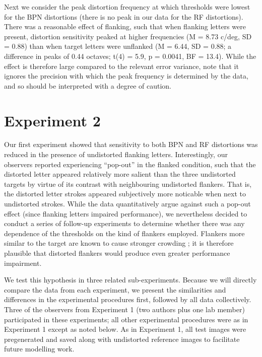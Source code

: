 \documentclass[doc, 11pt,a4paper,natbib]{apa6}\usepackage[]{graphicx}\usepackage[]{color}
\begin{document}
Next we consider the peak distortion frequency at which thresholds were lowest for the BPN distortions (there is no peak in our data for the RF distortions).
There was a reasonable effect of flanking, such that when flanking letters were present, distortion sensitivity peaked at higher frequencies
(M = 8.73 c/deg,
SD = 0.88)
than when target letters were unflanked
(M = 6.44,
SD = 0.88; a difference in
peaks of
0.44
octaves;
t(4) = 5.9, p = 0.0041, BF = 13.4).
While the effect is therefore large compared to the relevant error variance, note that it ignores the precision with which the peak frequency is determined by the data, and so should be interpreted with a degree of caution.






\section{Experiment 2}

Our first experiment showed that sensitivity to both BPN and RF distortions was reduced in the presence of undistorted flanking letters.
Interestingly, our observers reported experiencing ``pop-out'' in the flanked condition, such that the distorted letter appeared relatively more salient than the three undistorted targets by virtue of its contrast with neighbouring undistorted flankers.
That is, the distorted letter strokes appeared subjectively more noticable when next to undistorted strokes.
While the data quantitatively argue against such a pop-out effect (since flanking letters impaired performance), we nevertheless decided to conduct a series of follow-up experiments to determine whether there was any dependence of the thresholds on the kind of flankers employed.
Flankers more similar to the target are known to cause stronger crowding \citep[e.g.][]{bernard_dependence_2011, kooi_effect_1994}; it is therefore plausible that distorted flankers would produce even greater performance impairment.


We test this hypothesis in three related sub-experiments.
Because we will directly compare the data from each experiment, we present the similarities and differences in the experimental procedures first, followed by all data collectively.
Three of the observers from Experiment 1 (two authors plus one lab member) participated in these experiments; all other experimental procedures were as in Experiment 1 except as noted below.
As in Experiment 1, all test images were pregenerated and saved along with undistorted reference images to facilitate future modelling work.
\end{document}
